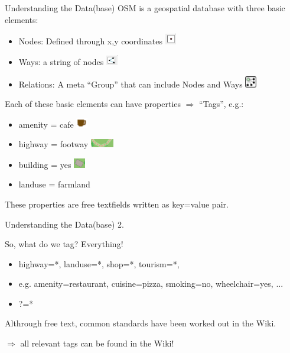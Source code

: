 \documentclass{beamer}
\begin{document}
\begin{frame}{Understanding the Data(base)}
  OSM is a geospatial database with three basic elements:

  \begin{itemize}
    \item Nodes: Defined through x,y coordinates \includegraphics[width=0.5cm]{node.png}
    \item Ways: a string of nodes \includegraphics[width=0.5cm]{way.png}
    \item Relations: A meta ``Group'' that can include Nodes and Ways \includegraphics[width=0.5cm]{relation.png}
  \end{itemize}

  \pause

  Each of these basic elements can have properties $\Rightarrow$ ``Tags'', e.g.:
  \begin{itemize}
    \item amenity = cafe \includegraphics[width=0.5cm]{cafe.png}
    \item highway = footway \includegraphics[width=1cm]{footway.png}
    \item building = yes  \includegraphics[width=0.5cm]{building.png}
    \item landuse = farmland 
  \end{itemize}

  These properties are free textfields written as key=value pair.

\end{frame}

\begin{frame}{Understanding the Data(base) 2.}
  
  So, what do we tag?
  \pause
  Everything!

\begin{itemize}
  \item highway=*, landuse=*, shop=*, tourism=*, 
  \item e.g. amenity=restaurant, cuisine=pizza, smoking=no, wheelchair=yes, ...
  \item ?=*
\end{itemize}

Althrough free text, common standards have been worked out in the Wiki.

$\Rightarrow$ all relevant tags can be found in the Wiki!

\end{frame}
\end{document}
